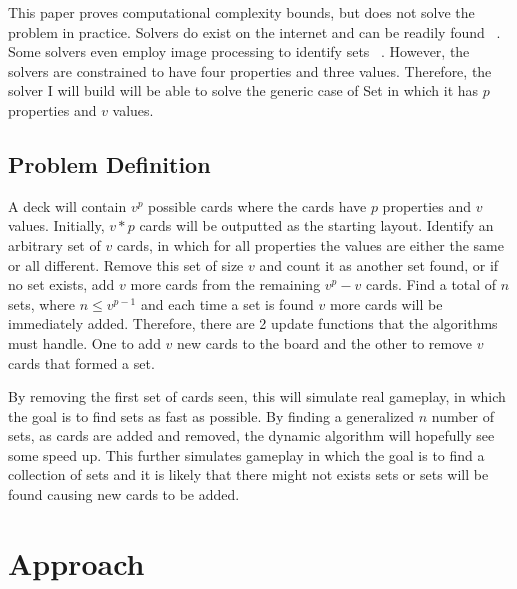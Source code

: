 \documentclass[pageno]{jpaper}
\begin{document}
This paper proves computational complexity bounds, but does not solve the problem in practice. Solvers do exist on the internet and can be readily found ~\cite{nolte}. Some solvers even employ image processing to identify sets ~\cite{jorquera}. However, the solvers are constrained to have four properties and three values. Therefore, the solver I will build will be able to solve the generic case of Set in which it has $p$ properties and $v$ values.  

\subsection{Problem Definition}

A deck will contain $v^p$ possible cards where the cards have $p$ properties and $v$ values. Initially, $v*p$ cards will be outputted as the starting layout. Identify an arbitrary set of $v$ cards, in which for all properties the values are either the same or all different. Remove this set of size $v$ and count it as another set found, or if no set exists, add $v$ more cards from the remaining $v^p - v$ cards. Find a total of $n$ sets, where $n \leq v^{p-1}$ and each time a set is found $v$ more cards will be immediately added. Therefore, there are 2 update functions that the algorithms must handle. One to add $v$ new cards to the board and the other to remove $v$ cards that formed a set. 

By removing the first set of cards seen, this will simulate real gameplay, in which the goal is to find sets as fast as possible. By finding a generalized $n$ number of sets, as cards are added and removed, the dynamic algorithm will hopefully see some speed up. This further simulates gameplay in which the goal is to find a collection of sets and it is likely that there might not exists sets or sets will be found causing new cards to be added. 

\section{Approach}
\end{document}
